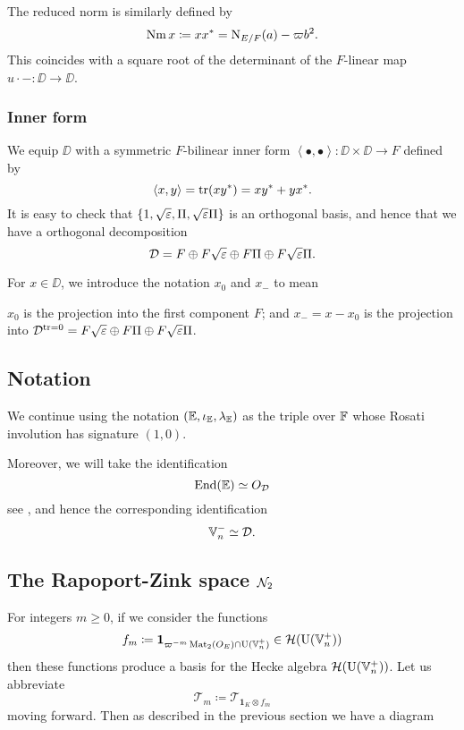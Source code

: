 The reduced norm is similarly defined by
\[ \operatorname{Nm} x \coloneqq x x^\ast = \operatorname{N}_{E/F}(a) - \varpi b^2. \]
This coincides with a square root of
the determinant of the $F$-linear map $u \cdot - \colon \DD \to \DD$.

\subsubsection{Inner form}
We equip $\DD$ with a symmetric $F$-bilinear inner form
$\left\langle \bullet, \bullet \right\rangle \colon \DD \times \DD \to F$ defined by
\[ \left\langle x,y \right\rangle = \operatorname{tr}(xy^\ast) = xy^\ast + yx^\ast. \]
It is easy to check that $\{1, \sqrt{\varepsilon}, \Pi, \sqrt{\varepsilon}\Pi\}$ is an orthogonal basis,
and hence that we have a orthogonal decomposition
\[ \mathcal D = F \oplus F\sqrt{\varepsilon} \oplus F \Pi \oplus F\sqrt{\varepsilon}\Pi. \]

For $x \in \DD$, we introduce the notation $x_0$ and $x_-$ to mean
\begin{itemize}
  \ii $x_0$ is the projection into the first component $F$; and
  \ii $x_- = x - x_0$ is the projection into
  $\mathcal D^{\operatorname{tr} = 0} = F\sqrt{\varepsilon} \oplus F \Pi \oplus F\sqrt{\varepsilon}\Pi$.
\end{itemize}

\subsection{Notation}
We continue using the notation $(\mathbb E, \iota_\mathbb E, \lambda_\mathbb E)$ as the triple over $\mathbb F$
whose Rosati involution has signature $(1,0)$.

Moreover, we will take the identification
\[ \operatorname{End}(\mathbb E) \simeq O_\mathcal D \]
see \cite[Remark 2.5]{ref:KR},
and hence the corresponding identification
\[ \mathbb V_n^- \simeq \mathcal D. \]

\subsection{The Rapoport-Zink space $\mathcal N_2$}
For integers $m \ge 0$, if we consider the functions
\[ f_m \coloneqq \mathbf{1}_{\varpi^{-m} \operatorname{Mat}_2(O_E) \cap \operatorname{U}(\mathbb V_n^+)} \in \mathcal H(\operatorname{U}(\mathbb V_n^+)) \]
then these functions produce a basis for the Hecke algebra $\mathcal H(\operatorname{U}(\mathbb V_n^+))$.
Let us abbreviate
\[ \mathcal{T}_m \coloneqq \mathcal{T}_{\mathbf{1}_K \otimes f_m} \]
moving forward.
Then as described in the previous section we have a diagram
\begin{center}
\end{center}

